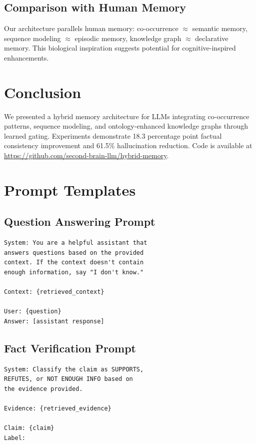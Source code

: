 \documentclass[conference]{IEEEtran}
\begin{document}
\subsection{Comparison with Human Memory}

Our architecture parallels human memory: co-occurrence $\approx$ semantic memory, sequence modeling $\approx$ episodic memory, knowledge graph $\approx$ declarative memory. This biological inspiration suggests potential for cognitive-inspired enhancements.

\section{Conclusion}

We presented a hybrid memory architecture for LLMs integrating co-occurrence patterns, sequence modeling, and ontology-enhanced knowledge graphs through learned gating. Experiments demonstrate 18.3 percentage point factual consistency improvement and 61.5\% hallucination reduction. Code is available at \url{https://github.com/second-brain-llm/hybrid-memory}.

\appendix

\section{Prompt Templates}
\label{app:prompts}

\subsection{Question Answering Prompt}
\begin{verbatim}
System: You are a helpful assistant that 
answers questions based on the provided 
context. If the context doesn't contain 
enough information, say "I don't know."

Context: {retrieved_context}

User: {question}
Answer: [assistant response]
\end{verbatim}

\subsection{Fact Verification Prompt}
\begin{verbatim}
System: Classify the claim as SUPPORTS,
REFUTES, or NOT ENOUGH INFO based on
the evidence provided.

Evidence: {retrieved_evidence}

Claim: {claim}
Label:
\end{verbatim}
\end{document}
